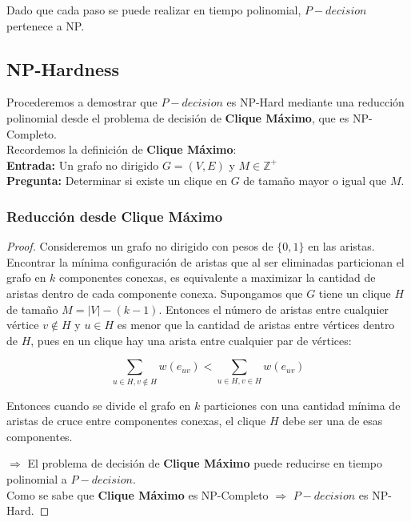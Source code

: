 \documentclass[a4paper, 12pt]{article}
\begin{document}
Dado que cada paso se puede realizar en tiempo polinomial, $P-decision$ pertenece a NP.

\subsection{NP-Hardness}
Procederemos a demostrar que $P-decision$ es 
NP-Hard mediante una reducción polinomial desde el 
problema de decisión de \textbf{Clique Máximo}, que es NP-Completo.\\

Recordemos la definición de \textbf{Clique Máximo}:\\
\textbf{Entrada:} Un grafo no dirigido $G = (V, E)$ y $ M \in \mathbb{Z}^{+}$\\
\textbf{Pregunta:} Determinar si existe un clique en $G$ de tamaño mayor o igual que $M$.

\subsubsection{Reducción desde Clique Máximo}

\begin{proof}
    


Consideremos un grafo no dirigido con pesos de $\{0,1\}$ en las aristas. 
Encontrar la mínima configuración de aristas que al ser eliminadas particionan 
el grafo en $k$ componentes conexas, es equivalente a maximizar la cantidad de aristas 
dentro de cada componente conexa. Supongamos que $G$ tiene un clique $H$ de tamaño $M = |V| - (k-1)$.
Entonces el número de aristas entre cualquier vértice $v \notin H$ y $u \in H$ es menor que la 
cantidad de aristas entre vértices dentro de $H$, pues en un clique hay una arista entre cualquier
par de vértices:


\[
    \sum_{u \in H, v \notin H}w(e_{uv}) < \sum_{u \in H, v \in H} w(e_{uv})
\]

Entonces cuando se divide el grafo en $k$ particiones con una cantidad mínima de aristas de cruce entre componentes conexas, el clique $H$ debe ser una de esas componentes.

$\Rightarrow$ El problema de decisión de \textbf{Clique Máximo} puede reducirse en tiempo polinomial a $P-decision$. \\
Como se sabe que \textbf{Clique Máximo} es NP-Completo $\Rightarrow$ $P-decision$ es NP-Hard.

\end{proof}
\end{document}
